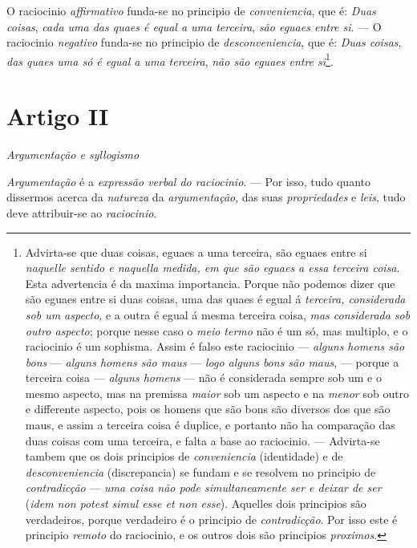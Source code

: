  
O raciocinio \emph{affirmativo} funda-se no principio de \emph{conveniencia}, que é: \emph{Duas coisas}, \emph{cada uma das quaes é equal a uma terceira}, \emph{são eguaes entre si}. --- O raciocinio \emph{negativo} funda-se no principio de \emph{desconveniencia}, que é: \emph{Duas coisas}, \emph{das quaes uma só é egual a uma terceira}, \emph{não são eguaes entre si}\footnote{Advirta-se que duas coisas, eguaes a uma terceira, são eguaes entre si \emph{naquelle sentido e naquella medida, em que são eguaes a essa terceira coisa}. Esta advertencia é da maxima importancia. Porque não podemos dizer que são eguaes entre si duas coisas, uma das quaes é egual á \emph{terceira, considerada sob um aspecto}, e a outra é egual á mesma terceira coisa, \emph{mas considerada sob outro aspecto}; porque nesse caso o \emph{meio termo} não é um só, mas multiplo, e o raciocinio é um sophisma. Assim é falso este raciocinio --- \emph{alguns homens são bons} --- \emph{alguns homens são maus} --- \emph{logo alguns bons são maus}, --- porque a terceira coisa --- \emph{alguns homens} --- não é considerada sempre sob um e o mesmo aspecto, mas na premissa \emph{maior} sob um aspecto e na \emph{menor} sob outro e differente aspecto, pois os homens que são bons são diversos dos que são maus, e assim a terceira coisa é duplice, e portanto não ha comparação das duas coisas com uma terceira, e falta a base ao raciocinio. --- Advirta-se tambem que os dois principios de \emph{conveniencia} (identidade) e de \emph{desconveniencia} (discrepancia) se fundam e se resolvem no principio de \emph{contradicção} --- \emph{uma coisa não pode simultaneamente ser e deixar de ser} (\emph{idem non potest simul esse et non esse}). Aquelles dois principios são verdadeiros, porque verdadeiro é o principio de \emph{contradicção}. Por isso este é principio \emph{remoto} do raciocinio, e os outros dois são principios \emph{proximos}.}.


\section*{Artigo II}

\emph{Argumentação e syllogismo}


\emph{Argumentação} é a \emph{expressão verbal do raciocinio}. --- Por isso, tudo quanto dissermos acerca da \emph{natureza} da \emph{argumentação}, das suas \emph{propriedades} e \emph{leis}, tudo deve attribuir-se ao \emph{raciocinio}.

